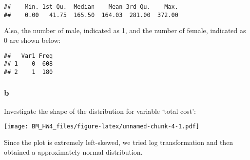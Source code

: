 \documentclass[]{article}
\newenvironment{Shaded}{\begin{snugshade}}{\end{snugshade}}
\newcommand{\KeywordTok}[1]{\textcolor[rgb]{0.13,0.29,0.53}{\textbf{#1}}}
\newcommand{\DataTypeTok}[1]{\textcolor[rgb]{0.13,0.29,0.53}{#1}}
\newcommand{\StringTok}[1]{\textcolor[rgb]{0.31,0.60,0.02}{#1}}
\newcommand{\OperatorTok}[1]{\textcolor[rgb]{0.81,0.36,0.00}{\textbf{#1}}}
\newcommand{\NormalTok}[1]{#1}
\begin{document}
\begin{verbatim}
##    Min. 1st Qu.  Median    Mean 3rd Qu.    Max. 
##    0.00   41.75  165.50  164.03  281.00  372.00
\end{verbatim}

Also, the number of male, indicated as 1, and the number of female,
indicated as 0 are shown below:

\begin{Shaded}
\end{Shaded}

\begin{verbatim}
##   Var1 Freq
## 1    0  608
## 2    1  180
\end{verbatim}

\subsubsection{b}\label{b-1}

Investigate the shape of the distribution for variable `total cost':

\begin{Shaded}
\end{Shaded}

\texttt{[image: BM\_HW4\_files/figure-latex/unnamed-chunk-4-1.pdf]}

Since the plot is extremely left-skewed, we tried log transformation and
then obtained a approximately normal distribution.

\begin{Shaded}
\end{Shaded}
\end{document}
